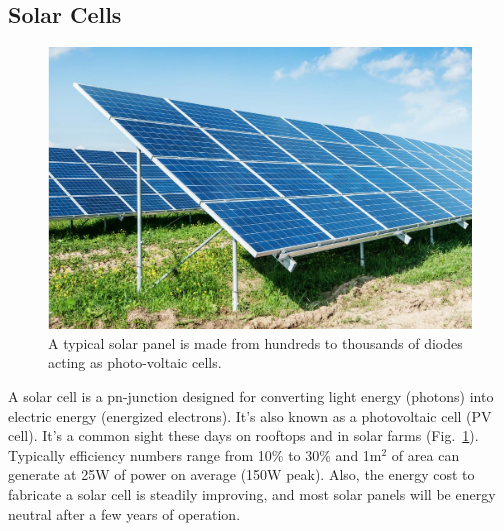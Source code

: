 \subsection{Solar Cells}
\begin{figure}[tb]
\begin{center}
\includegraphics[width=.5\columnwidth]{solar_cell.jpg}
\end{center}
\caption{A typical solar panel is made from hundreds to thousands of diodes acting as photo-voltaic cells. }
\label{fig:solar_cell}
\end{figure}

A solar cell is a pn-junction designed for converting light energy (photons) into electric energy (energized electrons).  It's also known as a photovoltaic cell (PV cell).  It's a common sight these days on rooftops and in solar farms (Fig.~\ref{fig:solar_cell}).   Typically efficiency numbers range from 10\% to 30\% and 1m$^2$ of area can generate at 25W of power on average (150W peak).  Also, the energy cost to fabricate a solar cell is steadily improving, and most solar panels will be energy neutral after a few years of operation.
